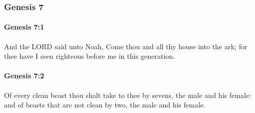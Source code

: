 	\subsubsection{Genesis 7} %
		\label{GENESIS-7}

		\paragraph{Genesis 7:1} %
			\label{GENESIS-7-1}

			And the LORD said unto Noah, Come thou and all thy house into the ark; for thee have I seen righteous before me in this generation.


		\paragraph{Genesis 7:2} %
			\label{GENESIS-7-2}

			Of every clean beast thou shalt take to thee by sevens, the male and his female: and of beasts that are not clean by two, the male and his female.

